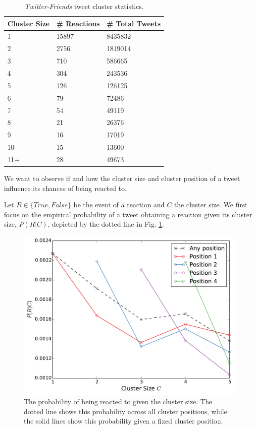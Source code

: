 \documentclass[onecolumn, 12 pt, doublespace, fullpage, letterpaper]{report}
\begin{document}
\begin{table}
  \centering
  \selectfont
  \begin{tabular}{lll}
      \toprule
      \textbf{Cluster Size} & \textbf{\# Reactions} & \textbf{\# Total Tweets} \\
      \midrule
      1 &  15897 &   8435832 \\
      2 &  2756 &    1819014 \\
      3 &  710 & 586665 \\
      4 &  304 & 243536 \\
      5 &  126 & 126125 \\
      6 &  79 &  72486 \\
      7 &  54 &  49119 \\
      8 &  21 &  26376 \\
      9 &  16 &  17019 \\
      10 & 15 &  13600 \\
      11+ & 28 & 49673 \\
      \bottomrule
  \end{tabular}
  \caption{\textit{Twitter-Friends} tweet cluster statistics.}
  \label{table:cluster-statistics}
\end{table}

We want to observe if and how the cluster size and cluster position of a tweet influence its chances of being reacted to.

Let $R \in \{True, False\}$ be the event of a reaction and $C$ the cluster size. We first focus on the empirical probability of a tweet obtaining a reaction given its cluster size, $P(R | C)$, depicted by the dotted line in Fig. \ref{fig:retweet-distribution}.

\begin{figure}
    \includegraphics[width=\linewidth]{retweet_probability}
    \caption[Retweet probability for each cluster size.]{The probability of being reacted to given the cluster size. The dotted line shows this probability across all cluster positions, while the solid lines show this probability given a fixed cluster position.}
    \label{fig:retweet-distribution}
\end{figure}
\end{document}
